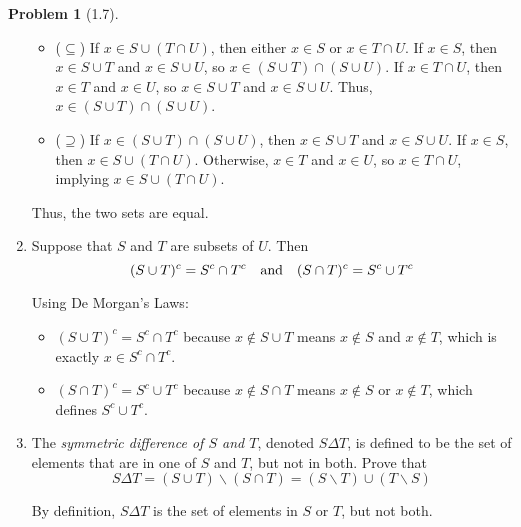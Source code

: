 \documentclass[12pt]{article}
\theoremstyle{definition}
\newtheorem{problem}{Problem}
\begin{document}
\begin{problem}[1.7]
\begin{enumerate}[label=(\alph*)]
\begin{solution}
            \begin{itemize}
                \item (\(\subseteq\)) If \( x \in S \cup (T \cap U) \), then either \( x \in S \) or \( x \in T \cap U \). If \( x \in S \), then \( x \in S \cup T \) and \( x \in S \cup U \), so \( x \in (S \cup T) \cap (S \cup U) \). If \( x \in T \cap U \), then \( x \in T \) and \( x \in U \), so \( x \in S \cup T \) and \( x \in S \cup U \). Thus, \( x \in (S \cup T) \cap (S \cup U) \).
                \item (\(\supseteq\)) If \( x \in (S \cup T) \cap (S \cup U) \), then \( x \in S \cup T \) and \( x \in S \cup U \). If \( x \in S \), then \( x \in S \cup (T \cap U) \). Otherwise, \( x \in T \) and \( x \in U \), so \( x \in T \cap U \), implying \( x \in S \cup (T \cap U) \).
            \end{itemize}
            Thus, the two sets are equal.
        \end{solution}
        \item Suppose that $S$ and $T$ are subsets of $U$. Then
              \[
              (S \cup T)^c = S^c \cap T^c \hspace{10px}\text{and}\hspace{10px} (S \cap T)^c = S^c \cup T^c
              \]
        \begin{solution}
            Using De Morgan’s Laws:
            \begin{itemize}
                \item \( (S \cup T)^c = S^c \cap T^c \) because \( x \notin S \cup T \) means \( x \notin S \) and \( x \notin T \), which is exactly \( x \in S^c \cap T^c \).
                \item \( (S \cap T)^c = S^c \cup T^c \) because \( x \notin S \cap T \) means \( x \notin S \) or \( x \notin T \), which defines \( S^c \cup T^c \).
            \end{itemize}
        \end{solution}
        \item The \textit{symmetric difference of $S$ and $T$}, denoted $S \Delta T$, is defined to be the set
              of elements that are in one of $S$ and $T$, but not in both. Prove that
              \[
              S \Delta T = (S \cup T) \backslash (S \cap T) = (S \backslash T) \cup (T \backslash S)
              \]
        \begin{solution}
            By definition, \( S \Delta T \) is the set of elements in \( S \) or \( T \), but not both.
            \begin{itemize}

\end{itemize}
\end{solution}
\end{enumerate}
\end{problem}
\end{document}
